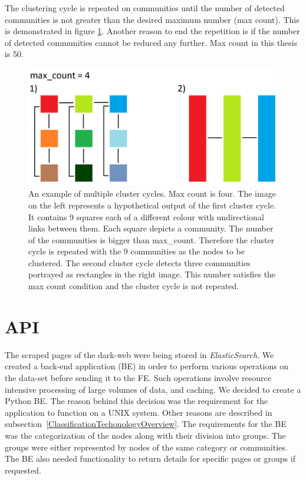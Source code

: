 The clustering cycle is repeated on communities until the number of detected communities is not greater than the desired maximum number (max count). This is demonstrated in figure \ref{clusteringCyclesExample}. Another reason to end the repetition is if the number of detected communities cannot be reduced any further. Max count in this thesis is 50.
\begin{figure}[ht!]
  \centering
  \includegraphics[width=\textwidth]{Images/clusteringCyclesExample.png}
  \caption{An example of multiple cluster cycles. Max count is four. The image on the left represents a hypothetical output of the first cluster cycle. It contains 9 squares each of a different colour with undirectional links between them. Each square depicts a community. The number of the communities is bigger than max\_count. Therefore the cluster cycle is repeated with the 9 communities as the nodes to be clustered. The second cluster cycle detects three communities portrayed as rectangles in the right image. This number satisfies the max count condition and the cluster cycle is not repeated.}
  \label{clusteringCyclesExample}
\end{figure} 

\section{API}\label{APIDevelopment}
The scraped pages of the dark-web were being stored in \textit{ElasticSearch}. We created a back-end application (BE) in order to perform various operations on the data-set before sending it to the FE. Such operations involve resource intensive processing of large volumes of data, and caching. We decided to create a Python BE. The reason behind this decision was the requirement for the application to function on a UNIX system. Other reasons are described in subsection~\ref{ClassificationTechonologyOverview}. The requirements for the BE was the categorization of the nodes along with their division into groups. The groups were either represented by nodes of the same category or communities. The BE also needed functionality to return details for specific pages or groups if requested.
